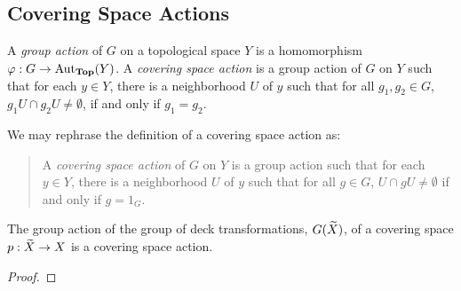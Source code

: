 \subsection{Covering Space Actions}

\begin{definition}
    A \textit{group action} of $G$ on a topological space $Y$ is a homomorphism $\varphi: G\to\operatorname{Aut}_{\mathbf{Top}}(Y)$. A \textit{covering space action} is a group action of $G$ on $Y$ such that for each $y\in Y$, there is a neighborhood $U$ of $y$ such that for all $g_1,g_2\in G$, $g_1U\cap g_2U\ne\emptyset$, if and only if  $g_1 = g_2$.
\end{definition}

We may rephrase the definition of a covering space action as: 
\begin{quote}
    A \textit{covering space action} of $G$ on $Y$ is a group action such that for each $y\in Y$, there is a neighborhood $U$ of $y$ such that for all $g\in G$, $U\cap gU\ne\emptyset$ if and only if $g = 1_G$.
\end{quote}

\begin{proposition}
    The group action of the group of deck transformations, $G(\widetilde{X})$, of a covering space $p:\widetilde{X}\to X$ is a covering space action.
\end{proposition}
\begin{proof}
\end{proof}

